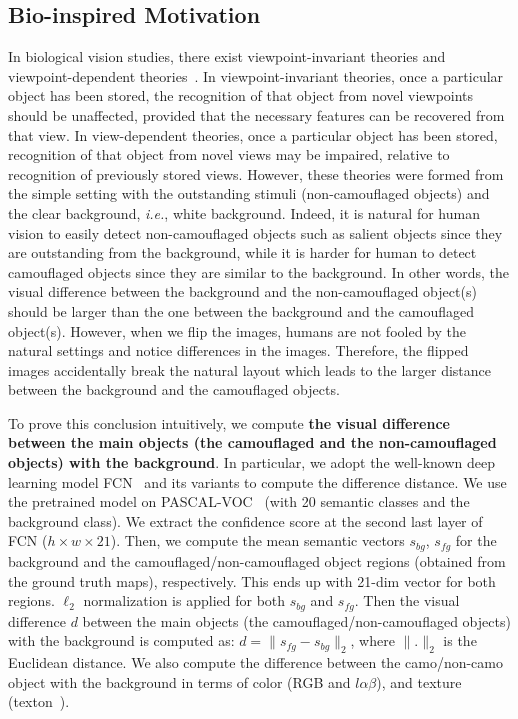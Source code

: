 \documentclass[journal]{IEEEtran}
\begin{document}
\subsection{Bio-inspired Motivation}
\label{sec:motivation}
In biological vision studies, there exist viewpoint-invariant theories and viewpoint-dependent theories~\cite{wilson2003does,burghund2000viewpoint,li2009computational}. In viewpoint-invariant theories, once a particular object has been stored, the recognition of that object from novel viewpoints should be unaffected, provided that the necessary features can be recovered from that view. In view-dependent theories, once a particular object has been stored,
recognition of that object from novel views may be impaired, relative to recognition of previously stored views. However, these theories were formed from the simple setting with the outstanding stimuli (non-camouflaged objects) and the clear background, \textit{i.e.}, white background. Indeed, it is natural for human vision to easily detect non-camouflaged objects such as salient objects since they are outstanding from the background, while it is harder for human to detect camouflaged objects since they are similar to the background. In other words, the visual difference between the background and the non-camouflaged object(s) should be larger than the one between the background and the camouflaged object(s). However, when we flip the images, humans are not fooled by the natural settings and notice differences in the images. Therefore, the flipped images accidentally break the natural layout which leads to the larger distance between the background and the camouflaged objects.



To prove this conclusion intuitively, we compute \textbf{the visual difference between the main objects (the camouflaged and the non-camouflaged objects) with the background}. In particular, we adopt the well-known deep learning model FCN~\cite{Long-ICCV2015} and its variants to compute the difference distance. We use the pretrained model on PASCAL-VOC~\cite{Everingham-ICCV2010} (with 20 semantic classes and the background class). We extract the confidence score at the second last layer of FCN ($h \times w \times 21$). Then, we compute the mean semantic vectors $s_{bg}$, $s_{fg}$ for the background and the camouflaged/non-camouflaged object regions (obtained from the ground truth maps), respectively. This ends up with 21-dim vector for both regions. $\ell_2$ normalization is applied for both $s_{bg}$ and $s_{fg}$. Then the visual difference $d$ between the main objects (the camouflaged/non-camouflaged objects) with the background is computed as: $d = \|s_{fg} - s_{bg}\|_2$, where $\|.\|_2$ is the Euclidean distance. We also compute the difference between the camo/non-camo object with the background in terms of color (RGB and $l\alpha\beta$), and texture (texton~\cite{texton}).
\end{document}
